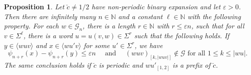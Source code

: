 \documentclass[11pt,reqno]{amsart}
\theoremstyle{plain}
\newtheorem{prop}[theorem]{Proposition}
\theoremstyle{definition}
\newcommand{\N}{{\mathbb N}}
\newcommand{\mc}{\mathcal}
\begin{document}
\begin{prop}
\label{PROP:word-modification-control}
Let $\breve{c} \neq 1/2$ have non-periodic binary expansion and let $\varepsilon > 0$. Then there are infinitely many $n \in \N$ and a constant $\ell \in \N$ with the following property. For each $w \in \mc G_n$, there is a length $r \in \N$ with $r \leqslant \varepsilon n$, such that for all $v\in \Sigma^\ell$, there is a word $u = u(v,w) \in \Sigma^r$ such that the following holds. If $y \in \langle wuv \rangle$ and $x \in \langle wu'v \rangle$ for some $u' \in \Sigma^r$, we have
\[
\psi_{n+r}(x) - \psi_{n+r}(y) \leqslant \varepsilon n\quad \text{ and } \quad (wuv)_{[k,|wuv|]} \notin \mc G \text{ for all } 1\leqslant k \leqslant |wu|.
\]
The same conclusion holds if $\breve{c}$ is periodic and $ wu'_{[1,2]}$ is a prefix of $\breve{c}$.
\end{prop}
\end{document}
